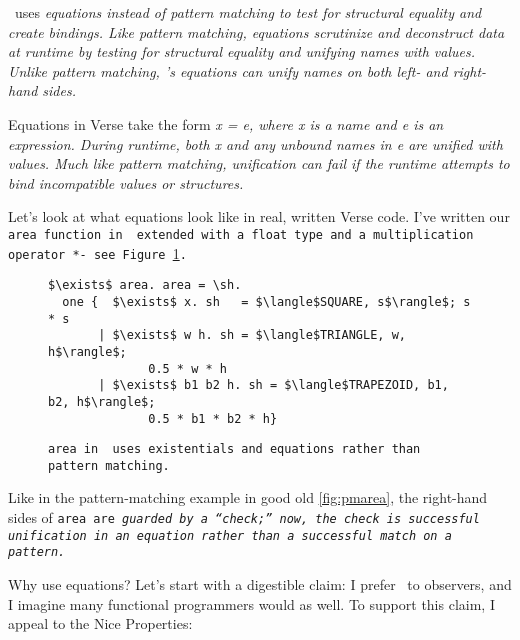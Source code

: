 \documentclass[manuscript,screen,review, 12pt, nonacm]{acmart}
\begin{document}
\begin{outline}[enumerate]
    \VC\ uses \it{equations} instead of pattern matching to test for structural
    equality and create bindings. Like pattern matching, equations scrutinize
    and deconstruct data at runtime by testing for structural equality and
    unifying names with values. Unlike pattern matching, \VC's equations can
    unify names on both left- \it{and} right-hand sides. 

    Equations in Verse take the form \it{x = e}, where \it{x} is a name and
    \it{e} is an expression. During runtime, both \it{x} and any unbound names
    in \it{e} are unified with values. Much like pattern matching, unification
    can fail if the runtime attempts to bind incompatible values or structures. 

    Let's look at what equations look like in real, written Verse code. I've
    written our \tt{area} function in \VC\ extended with a \tt{float} type and a
    multiplication operator \tt{*}- see Figure~\ref{fig:versearea}. 

    

    \begin{figure}[]
        \verselst
        \begin{lstlisting}[numbers=none]
$\exists$ area. area = \sh. 
  one {  $\exists$ x. sh   = $\langle$SQUARE, s$\rangle$; s * s
       | $\exists$ w h. sh = $\langle$TRIANGLE, w, h$\rangle$; 
              0.5 * w * h
       | $\exists$ b1 b2 h. sh = $\langle$TRAPEZOID, b1, b2, h$\rangle$; 
              0.5 * b1 * b2 * h}
        \end{lstlisting}
    \caption{\tt{area} in \VC\ uses existentials and equations rather than
    pattern matching.} 
    \label{fig:versearea}
    \end{figure}

    Like in the pattern-matching example in good old \ref{fig:pmarea}, the
    right-hand sides of \tt{area} are \it{guarded} by a “check;” now, the check
    is successful unification in an equation rather than a successful match on a
    pattern. 

    Why use equations? Let's start with a digestible claim: I prefer \VC\ to
    observers, and I imagine many functional programmers would as well. To 
    support this claim, I appeal to the Nice Properties: 


\end{outline}
\end{document}
